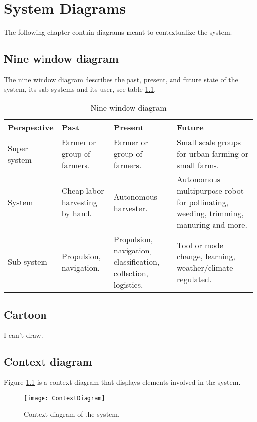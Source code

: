 \documentclass[%
oneside,    %
project,    %
nosummary   %
]{USN-MSc}
\begin{document}
\chapter{System Diagrams}
\label{ch:diagrams}
The following chapter contain diagrams meant to contextualize the system.

\section{Nine window diagram}
\label{sec:nineWindow}
The nine window diagram describes the past, present, and future state of the system, its sub-systems and its user, see table \ref{tab:nineWindow}.
\begin{table}[!ht]
  \caption{Nine window diagram}
   \centering
    \begin{tabular}{ | m{3cm} | m{3cm} | m{3cm} | m{5cm} |}
     \hline
     Perspective & Past & Present & Future \\ \hline
     Super system & Farmer or group of farmers. & Farmer or group of farmers. 
     & Small scale groups for urban farming or small farms. \\ \hline
     System & Cheap labor harvesting by hand. & Autonomous harvester. 
     & Autonomous multipurpose robot for pollinating, weeding, trimming, manuring and more. \\ \hline
     Sub-system & Propulsion, navigation. & Propulsion, navigation, classification, collection, logistics. 
     & Tool or mode change, learning, weather/climate regulated. \\ \hline
     \end{tabular}
     \label{tab:nineWindow}
 \end{table}

\section{Cartoon}
\label{sec:cartoon}
I can't draw.

\section{Context diagram}
\label{sec:contextDiagram}

Figure \ref{fig:contextDiagram} is a context diagram that displays elements involved in the system.

\begin{figure}[!ht]
  \centering
 \texttt{[image: ContextDiagram]}
 \caption{Context diagram of the system.}
 \label{fig:contextDiagram}
\end{figure}
\end{document}
